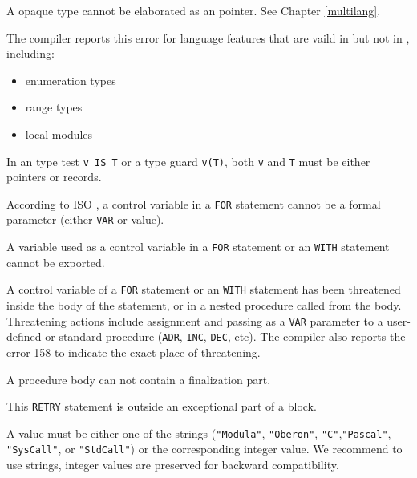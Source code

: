 A \mt{} opaque type cannot be elaborated as an \ot{} pointer.
See Chapter \ref{multilang}.


The compiler reports this error for language features that are
vaild in \mt{} but not in \ot{}, including:
\begin{itemize}
\item enumeration types
\item range types
\item local modules
\end{itemize}


In an \ot{} type test \verb'v IS T' or a type guard \verb'v(T)',
both \verb'v' and \verb'T' must be either pointers or records.


According to ISO \mt{}, a control variable in a \verb'FOR'
statement cannot be a formal parameter (either \verb'VAR' or value).


A variable used as a control variable in a \verb'FOR' statement
or an \ot{} \verb'WITH' statement cannot be exported.


A control variable of a \verb'FOR' statement or an \ot{} \verb'WITH'
statement has been threatened inside the body of the statement,
or in a nested procedure called from the body.  Threatening actions
include assignment and passing as a \verb'VAR' parameter to a user-defined or
standard procedure (\verb'ADR', \verb'INC', \verb'DEC', etc).
The compiler also reports the error 158 to indicate the exact place of threatening.


A procedure body can not contain a finalization part.


This \verb'RETRY' statement is outside an exceptional part of a block.


A value must be either one of the strings (\verb'"Modula"', \verb'"Oberon"',
\verb'"C"',\verb'"Pascal"', \verb'"SysCall"', or \verb'"StdCall"') or the
corresponding integer value.  We recommend to use strings, integer values
are preserved for backward compatibility.

